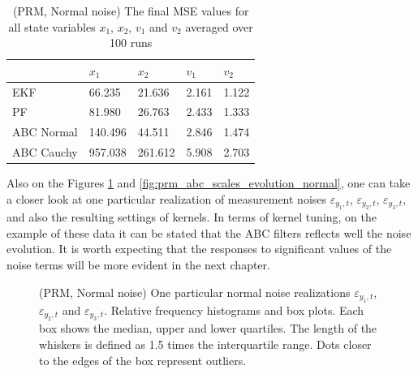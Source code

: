 \begin{table}[h!]
\centering
\begin{tabular}{ |p{2cm}|p{2cm}|p{2cm}|p{2cm}|p{2cm}|}
 \hline 
  & $x_1$ & $x_2$ & $v_1$ & $v_2$ \\
 \hline \hline
 EKF & 66.235 & 21.636 & 2.161 & 1.122  \\
 PF & 81.980  & 26.763 & 2.433 & 1.333 \\
 ABC Normal & 140.496 & 44.511 & 2.846 & 1.474 \\
 ABC Cauchy & 957.038 & 261.612 & 5.908 & 2.703 \\
 \hline
\end{tabular}
\caption{(PRM, Normal noise) The final MSE values for all state variables $x_1$, $x_2$, $v_1$ and $v_2$ averaged over 100 runs}
\label{table:prm_mse_normal}
\end{table}

Also on the Figures \ref{fig:prm_measurement_noise_normal} and \ref{fig:prm_abc_scales_evolution_normal}, one can take a closer look at one particular realization of measurement noises \(\varepsilon_{y_1,t}\), \(\varepsilon_{y_2,t}\), \(\varepsilon_{y_3,t}\), and also the resulting settings of kernels. In terms of kernel tuning, on the example of these data it can be stated that the ABC filters reflects well the noise evolution. It is worth expecting that the responses to significant values of the noise terms will be more evident in the next chapter.

\begin{figure}[!ht]
\centering
\caption{(PRM, Normal noise) One particular normal noise realizations \(\varepsilon_{y_1,t}\), \(\varepsilon_{y_2,t}\) and \(\varepsilon_{y_3,t}\). Relative frequency histograms and box plots. Each box shows the median, upper and lower quartiles. The length of
the whiskers is defined as 1.5 times the interquartile range. Dots closer to the edges of the box represent
outliers.}
\label{fig:prm_measurement_noise_normal}
\end{figure}

